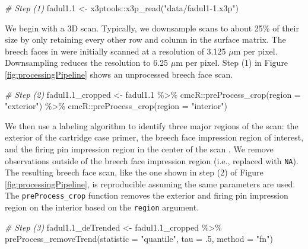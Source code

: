 \documentclass[11pt,]{isuthesis}
\newenvironment{Shaded}{\begin{snugshade}}{\end{snugshade}}
\newcommand{\AttributeTok}[1]{\textcolor[rgb]{0.77,0.63,0.00}{#1}}
\newcommand{\CommentTok}[1]{\textcolor[rgb]{0.56,0.35,0.01}{\textit{#1}}}
\newcommand{\DecValTok}[1]{\textcolor[rgb]{0.00,0.00,0.81}{#1}}
\newcommand{\FloatTok}[1]{\textcolor[rgb]{0.00,0.00,0.81}{#1}}
\newcommand{\FunctionTok}[1]{\textcolor[rgb]{0.00,0.00,0.00}{#1}}
\newcommand{\NormalTok}[1]{#1}
\newcommand{\OtherTok}[1]{\textcolor[rgb]{0.56,0.35,0.01}{#1}}
\newcommand{\SpecialCharTok}[1]{\textcolor[rgb]{0.00,0.00,0.00}{#1}}
\newcommand{\StringTok}[1]{\textcolor[rgb]{0.31,0.60,0.02}{#1}}
\begin{document}
\begin{Shaded}
\begin{Highlighting}[]
\CommentTok{\# Step (1)}
\NormalTok{fadul1}\FloatTok{.1} \OtherTok{\textless{}{-}}\NormalTok{ x3ptools}\SpecialCharTok{::}\FunctionTok{x3p\_read}\NormalTok{(}\StringTok{"data/fadul1{-}1.x3p"}\NormalTok{)}
\end{Highlighting}
\end{Shaded}

We begin with a 3D scan.
Typically, we downsample scans to about 25\% of their size by only retaining every other row and column in the surface matrix.
The breech faces in \citet{fadul_empirical_2011} were initially scanned at a resolution of 3.125 \(\mu\)m per pixel.
Downsampling reduces the resolution to 6.25 \(\mu\)m per pixel.
Step (1) in Figure \ref{fig:processingPipeline} shows an unprocessed breech face scan.

\begin{Shaded}
\begin{Highlighting}[]
\CommentTok{\# Step (2)}
\NormalTok{fadul1}\FloatTok{.1}\NormalTok{\_cropped }\OtherTok{\textless{}{-}}\NormalTok{ fadul1}\FloatTok{.1} \SpecialCharTok{\%\textgreater{}\%}
\NormalTok{  cmcR}\SpecialCharTok{::}\FunctionTok{preProcess\_crop}\NormalTok{(}\AttributeTok{region =} \StringTok{"exterior"}\NormalTok{) }\SpecialCharTok{\%\textgreater{}\%}
\NormalTok{  cmcR}\SpecialCharTok{::}\FunctionTok{preProcess\_crop}\NormalTok{(}\AttributeTok{region =} \StringTok{"interior"}\NormalTok{)}
\end{Highlighting}
\end{Shaded}

We then use a labeling algorithm to identify three major regions of the scan: the exterior of the cartridge case primer, the breech face impression region of interest, and the firing pin impression region in the center of the scan \citep{hesselink_concurrent_2001, imager}.
We remove observations outside of the breech face impression region (i.e., replaced with \texttt{NA}).
The resulting breech face scan, like the one shown in step (2) of Figure \ref{fig:processingPipeline}, is reproducible assuming the same parameters are used.
The \texttt{preProcess\_crop} function removes the exterior and firing pin impression region on the interior based on the \texttt{region} argument.

\begin{Shaded}
\begin{Highlighting}[]
\CommentTok{\# Step (3)}
\NormalTok{fadul1}\FloatTok{.1}\NormalTok{\_deTrended }\OtherTok{\textless{}{-}}\NormalTok{ fadul1}\FloatTok{.1}\NormalTok{\_cropped }\SpecialCharTok{\%\textgreater{}\%}
  \FunctionTok{preProcess\_removeTrend}\NormalTok{(}\AttributeTok{statistic =} \StringTok{"quantile"}\NormalTok{, }\AttributeTok{tau =}\NormalTok{ .}\DecValTok{5}\NormalTok{, }\AttributeTok{method =} \StringTok{"fn"}\NormalTok{)}
\end{Highlighting}
\end{Shaded}
\end{document}
